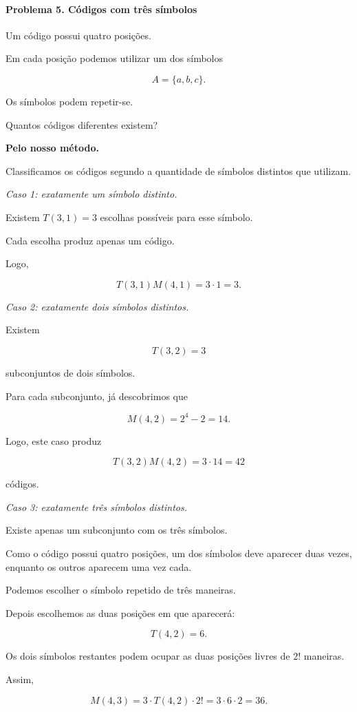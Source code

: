 \documentclass[11pt,a4paper,oneside]{book}
\begin{document}
\paragraph{Problema 5. Códigos com três símbolos}

Um código possui quatro posições.

Em cada posição podemos utilizar
um dos símbolos

\[
A=\{a,b,c\}.
\]

Os símbolos podem repetir-se.

Quantos códigos diferentes existem?

\textbf{Pelo nosso método.}

Classificamos os códigos segundo a quantidade
de símbolos distintos que utilizam.

\emph{Caso 1: exatamente um símbolo distinto.}

Existem $T(3,1)=3$ escolhas possíveis
para esse símbolo.

Cada escolha produz apenas um código.

Logo,

\[
T(3,1)M(4,1)=3\cdot1=3.
\]

\emph{Caso 2: exatamente dois símbolos distintos.}

Existem

\[
T(3,2)=3
\]

subconjuntos de dois símbolos.

Para cada subconjunto, já descobrimos que

\[
M(4,2)=2^4-2=14.
\]

Logo, este caso produz

\[
T(3,2)M(4,2)=3\cdot14=42
\]

códigos.

\emph{Caso 3: exatamente três símbolos distintos.}

Existe apenas um subconjunto com os três símbolos.

Como o código possui quatro posições,
um dos símbolos deve aparecer duas vezes,
enquanto os outros aparecem uma vez cada.

Podemos escolher o símbolo repetido
de três maneiras.

Depois escolhemos as duas posições
em que aparecerá:

\[
T(4,2)=6.
\]

Os dois símbolos restantes podem ocupar
as duas posições livres de $2!$ maneiras.

Assim,

\[
M(4,3)=3\cdot T(4,2)\cdot2!
       =3\cdot6\cdot2=36.
\]
\end{document}
